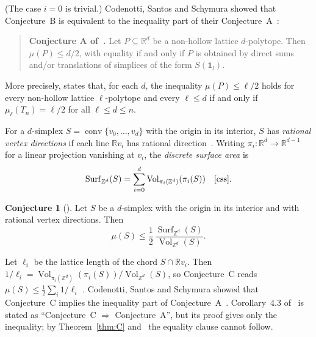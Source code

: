 \documentclass[11pt]{article}
\theoremstyle{definition}
\newtheorem{conjecture}{Conjecture}
\theoremstyle{remark}
\newcommand{\R}{\mathbb R}
\newcommand{\Z}{\mathbb Z}
\newcommand{\one}{\mathbf 1}
\newcommand{\conv}{\operatorname{conv}}
\newcommand{\Vol}{\operatorname{Vol}}
\newcommand{\Surf}{\operatorname{Surf}}
\begin{document}
\noindent (The case $i=0$ is trivial.) Codenotti, Santos and Schymura showed
that Conjecture~B is equivalent to the inequality part of their
Conjecture~A~\cite[Theorem~1.2]{css}:

\begin{quote}
\textbf{Conjecture A of~\cite{css}.} Let $P\subseteq\R^d$ be a non-hollow
lattice $d$-polytope. Then $\mu(P)\le d/2$, with equality if and only if $P$
is obtained by direct sums and/or translations of simplices of the form
$S(\one_l)$.
\end{quote}

\noindent More precisely, \cite[Theorem~1.2]{css} states that, for each $d$,
the inequality $\mu(P)\le\ell/2$ holds for every non-hollow lattice
$\ell$-polytope and every $\ell\le d$ if and only if $\mu_\ell(T_n)=\ell/2$ for
all $\ell\le d\le n$.

For a $d$-simplex $S=\conv\{v_0,\dots,v_d\}$ with the origin in its interior,
$S$ has \emph{rational vertex directions} if each line $\R v_i$ has rational
direction~\cite[Definition~1.5]{css}. Writing $\pi_i\colon\R^d\to\R^{d-1}$ for
a linear projection vanishing at $v_i$, the \emph{discrete surface area} is
\[
\Surf_{\Z^d}(S)=\sum_{i=0}^d\Vol_{\pi_i(\Z^d)}(\pi_i(S))
\quad\text{\cite[Definition~1.5]{css}}.
\]

\setcounter{conjecture}{2}
\begin{conjecture}[{\cite[Conjecture~C]{css}}]\label{conj:C}
Let $S$ be a $d$-simplex with the origin in its interior and with rational
vertex directions. Then
\[
\mu(S)\le\frac12\,\frac{\Surf_{\Z^d}(S)}{\Vol_{\Z^d}(S)} .
\]
\end{conjecture}

\noindent Let $\ell_i$ be the lattice length of the chord $S\cap\R v_i$. Then
$1/\ell_i=\Vol_{\pi_i(\Z^d)}(\pi_i(S))/\Vol_{\Z^d}(S)$, so Conjecture~C reads
$\mu(S)\le\frac12\sum_i1/\ell_i$ \cite[Lemma~4.1, eq.~(6)]{css}. Codenotti,
Santos and Schymura showed that Conjecture~C implies the inequality part of
Conjecture~A~\cite[Corollary~4.3 and its proof]{css}. Corollary~4.3
of~\cite{css} is stated as ``Conjecture~C $\Rightarrow$ Conjecture~A'', but its
proof gives only the inequality; by Theorem~\ref{thm:C} and~\cite[Remark~3]{p21}
the equality clause cannot follow.
\end{document}
